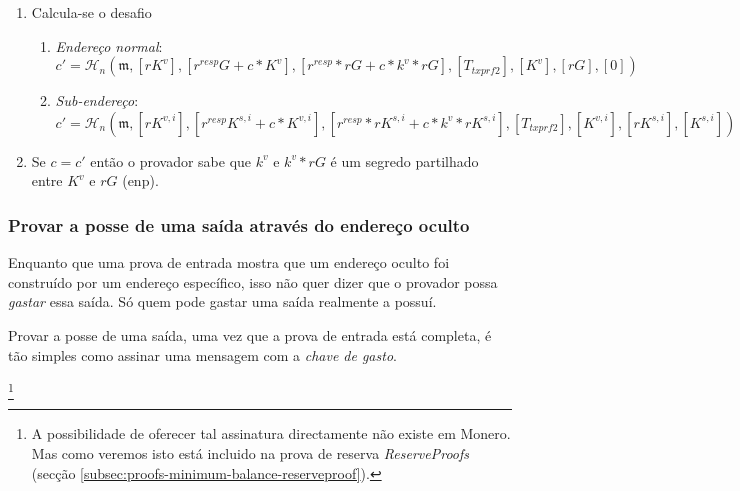 \begin{enumerate}
    \item Calcula-se o desafio
    \begin{enumerate}
        \item {\em Endereço normal}:\vspace{.145cm}
	    \[c' = \mathcal{H}_n(\mathfrak{m},[rK^v], [r^{resp} G + c*K^v], [r^{resp}*r G + c*k^v*r G], [T_{txprf2}], [K^v], [rG], [0])\]
	    \item {\em Sub-endereço}:\vspace{.16cm}
	    \[c' = \mathcal{H}_n(\mathfrak{m},[rK^{v,i}], [r^{resp} K^{s,i} + c*K^{v,i}], [r^{resp}*r K^{s,i} + c*k^v*r K^{s,i}], [T_{txprf2}], [K^{v,i}], [r K^{s,i}], [K^{s,i}])\]
    \end{enumerate}{}
    \item Se $c = c'$ então o provador sabe que $k^v$ e $k^v*r G$ é um segredo partilhado entre $K^v$ e $r G$ (enp). 
\end{enumerate}{}

\subsubsection*{Provar a posse de uma saída através do endereço oculto}

Enquanto que uma prova de entrada mostra que um endereço oculto foi construído por um endereço específico, isso não quer dizer que o provador possa {\em gastar} essa saída. Só quem pode gastar uma saída realmente a possuí.  


Provar a posse de uma saída, uma vez que a prova de entrada está completa, é tão simples como assinar uma mensagem com a {\em chave de gasto}.

\footnote{A possibilidade de oferecer tal assinatura directamente não existe em Monero. Mas como veremos isto está incluido na prova de reserva {\em ReserveProofs} (secção \ref{subsec:proofs-minimum-balance-reserveproof}).}   

